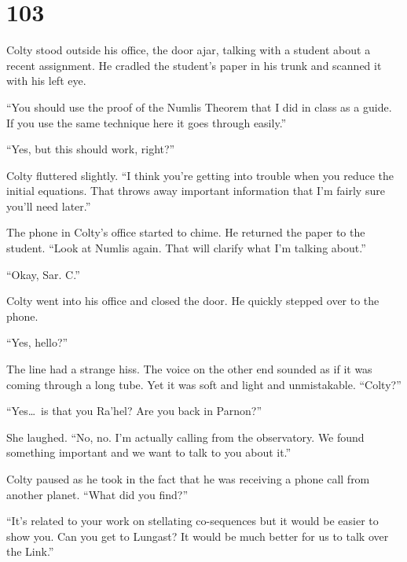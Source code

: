 
\chapter{103}


Colty stood outside his office, the door ajar, talking with a student about a recent assignment.
He cradled the student's paper in his trunk and scanned it with his left eye.

``You should use the proof of the Numlis Theorem that I did in class as a guide. If you use the
same technique here it goes through easily.''

``Yes, but this should work, right?''

Colty fluttered slightly. ``I think you're getting into trouble when you reduce the initial
equations. That throws away important information that I'm fairly sure you'll need later.''

The phone in Colty's office started to chime. He returned the paper to the student. ``Look at
Numlis again. That will clarify what I'm talking about.''

``Okay, Sar. C.''

Colty went into his office and closed the door. He quickly stepped over to the phone.

``Yes, hello?''

The line had a strange hiss. The voice on the other end sounded as if it was coming through a
long tube. Yet it was soft and light and unmistakable. ``Colty?''

``Yes\ldots\ is that you Ra'hel? Are you back in Parnon?''

She laughed. ``No, no. I'm actually calling from the observatory. We found something important
and we want to talk to you about it.''

Colty paused as he took in the fact that he was receiving a phone call from another planet.
``What did you find?''

``It's related to your work on stellating co-sequences but it would be easier to show you. Can
you get to Lungast? It would be much better for us to talk over the Link.''

